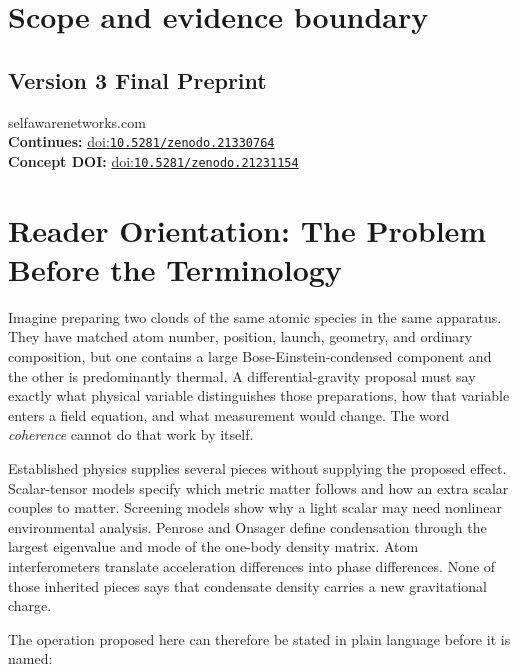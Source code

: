 \documentclass[
  american,
  11pt,
  letterpaper,
]{article}
\begin{document}
\section{Scope and evidence boundary}\label{scope-and-evidence-boundary}

\subsection{Version 3 Final Preprint}\label{version-3-final-preprint}

selfawarenetworks.com\\
\textbf{Continues:} \href{https://doi.org/10.5281/zenodo.21330764}{doi:\nolinkurl{10.5281/zenodo.21330764}}\\
\textbf{Concept DOI:} \href{https://doi.org/10.5281/zenodo.21231154}{doi:\nolinkurl{10.5281/zenodo.21231154}}

\section{Reader Orientation: The Problem Before the Terminology}\label{reader-orientation-the-problem-before-the-terminology}

Imagine preparing two clouds of the same atomic species in the same apparatus. They have matched atom number, position, launch, geometry, and ordinary composition, but one contains a large Bose-Einstein-condensed component and the other is predominantly thermal. A differential-gravity proposal must say exactly what physical variable distinguishes those preparations, how that variable enters a field equation, and what measurement would change. The word \emph{coherence} cannot do that work by itself.

Established physics supplies several pieces without supplying the proposed effect. Scalar-tensor models specify which metric matter follows and how an extra scalar couples to matter. Screening models show why a light scalar may need nonlinear environmental analysis. Penrose and Onsager define condensation through the largest eigenvalue and mode of the one-body density matrix. Atom interferometers translate acceleration differences into phase differences. None of those inherited pieces says that condensate density carries a new gravitational charge.

The operation proposed here can therefore be stated in plain language before it is named:
\end{document}
